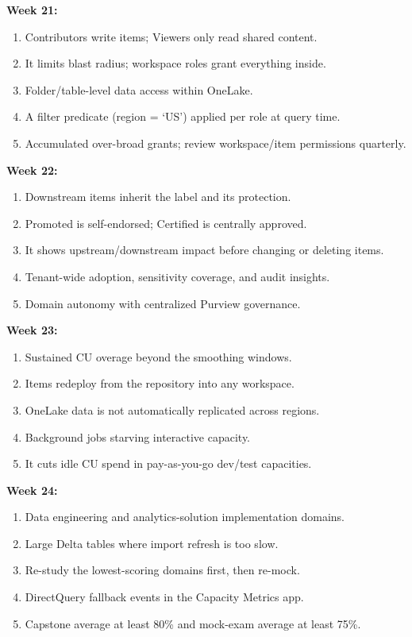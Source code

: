 \documentclass[11pt, a4paper]{article}
\begin{document}
\noindent\textbf{Week 21:}
\begin{enumerate}[leftmargin=8mm, itemsep=0pt]
    \item Contributors write items; Viewers only read shared content.
    \item It limits blast radius; workspace roles grant everything inside.
    \item Folder/table-level data access within OneLake.
    \item A filter predicate (region = `US') applied per role at query time.
    \item Accumulated over-broad grants; review workspace/item permissions quarterly.
\end{enumerate}

\noindent\textbf{Week 22:}
\begin{enumerate}[leftmargin=8mm, itemsep=0pt]
    \item Downstream items inherit the label and its protection.
    \item Promoted is self-endorsed; Certified is centrally approved.
    \item It shows upstream/downstream impact before changing or deleting items.
    \item Tenant-wide adoption, sensitivity coverage, and audit insights.
    \item Domain autonomy with centralized Purview governance.
\end{enumerate}

\noindent\textbf{Week 23:}
\begin{enumerate}[leftmargin=8mm, itemsep=0pt]
    \item Sustained CU overage beyond the smoothing windows.
    \item Items redeploy from the repository into any workspace.
    \item OneLake data is not automatically replicated across regions.
    \item Background jobs starving interactive capacity.
    \item It cuts idle CU spend in pay-as-you-go dev/test capacities.
\end{enumerate}

\noindent\textbf{Week 24:}
\begin{enumerate}[leftmargin=8mm, itemsep=0pt]
    \item Data engineering and analytics-solution implementation domains.
    \item Large Delta tables where import refresh is too slow.
    \item Re-study the lowest-scoring domains first, then re-mock.
    \item DirectQuery fallback events in the Capacity Metrics app.
    \item Capstone average at least 80\% and mock-exam average at least 75\%.
\end{enumerate}
\end{document}
